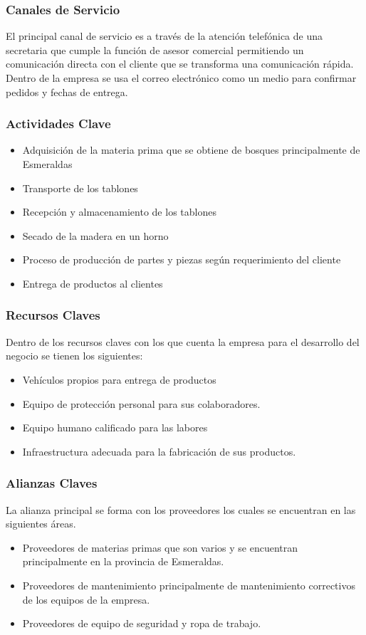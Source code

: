 \documentclass[12pt, a4paper]{article}
\begin{document}
\begin{itemize}
\subsubsection{Canales de Servicio}

El principal canal de servicio es a través de la atención  telefónica de una secretaria que cumple la función de asesor comercial permitiendo un comunicación directa con el cliente que se transforma una comunicación rápida. Dentro de la empresa se usa el correo electrónico como un medio para confirmar pedidos y fechas de entrega.

\subsubsection{Actividades Clave}
\begin{itemize}
	\item  Adquisición de la materia prima que se obtiene de bosques principalmente de Esmeraldas
	\item  Transporte de los tablones
	\item  Recepción y almacenamiento de los tablones
	\item  Secado de la madera en un horno
	\item  Proceso de producción de partes y piezas según requerimiento del cliente
	\item  Entrega de  productos al clientes
\end{itemize}
\subsubsection{Recursos Claves}
Dentro de los recursos claves con los que cuenta la empresa para el desarrollo del negocio se tienen los siguientes:
\begin{itemize}
	\item Vehículos propios para entrega de productos
	\item Equipo de protección personal para sus colaboradores.
	\item Equipo humano calificado para las labores
	\item Infraestructura adecuada para la fabricación de sus productos.
\end{itemize}
\subsubsection{Alianzas Claves}
La alianza principal se forma con los proveedores los cuales se encuentran en las siguientes áreas.
\begin {itemize}
	\item Proveedores de materias primas que son varios y se encuentran principalmente en la provincia de Esmeraldas.
	\item Proveedores de mantenimiento principalmente de mantenimiento correctivos de los equipos de la empresa.
	\item Proveedores de equipo de seguridad y ropa de trabajo.
\end{itemize}

\end{itemize}
\end{document}
